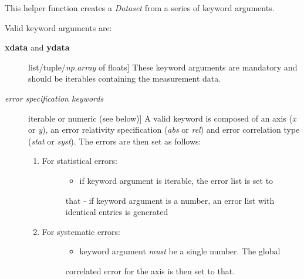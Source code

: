\documentclass[a4paper,10pt,english]{sphinxmanual}
\begin{document}
\begin{fulllineitems}
\label{index:kafe.dataset.build_dataset}
This helper function creates a \emph{Dataset} from a series of keyword
arguments.

Valid keyword arguments are:
\begin{description}
\item[{\textbf{xdata} and \textbf{ydata}}] \leavevmode{[}list/tuple/\emph{np.array} of floats{]}
These keyword arguments are mandatory and should be iterables
containing the measurement data.

\item[{\emph{error specification keywords}}] \leavevmode{[}iterable or numeric (see below){]}
A valid keyword is composed of an axis (\emph{x} or \emph{y}), an error
relativity specification (\emph{abs} or \emph{rel}) and error correlation type
(\emph{stat} or \emph{syst}). The errors are then set as follows:
\begin{enumerate}
\item {} \begin{description}
\item[{For statistical errors:}] \leavevmode\begin{itemize}
\item {} 
if keyword argument is iterable, the error list is set to

\end{itemize}

that
- if keyword argument is a number, an error list with identical
entries is generated

\end{description}

\item {} \begin{description}
\item[{For systematic errors:}] \leavevmode\begin{itemize}
\item {} 
keyword argument \emph{must} be a single number. The global

\end{itemize}

correlated error for the axis is then set to that.

\end{description}

\end{enumerate}


\end{description}
\end{fulllineitems}
\end{document}
